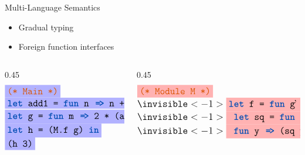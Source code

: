 \begin{frame}

  \huge Multi-Language Semantics \pause

  \vspace{1em}
  \begin{itemize}
  \Large
  \item Gradual typing \pause
  \item Foreign function interfaces
  \end{itemize}

\end{frame}

\begin{frame}

  \Large
  \begin{columns}[t]
    \begin{column}{0.45\textwidth}
      \[
      \large
      \begin{array}{@{}ll@{}}
        \bluebox{\mex{\textcolor{dkcomment}{(* Main *)}}}\\
        \bluebox{\mex{\kw{let} add1 = \kw{fun} n \codearr n + 1 \kw{in}}} \\
        \bluebox{\mex{\kw{let} g = \kw{fun} m \codearr 2 * (add1 m) \kw{in}}} \\
        \bluebox{\mex{\kw{let} h = (M.f g) \kw{in}}} \\
        \bluebox{\mex{(h 3)}}
      \end{array}
      \]
    \end{column}

    \begin{column}{0.45\textwidth}
      \[
      \large
      \begin{array}{@{}ll@{}}
        \redbox{\mex{\textcolor{dkcomment}{(* Module M *)}}} \\
        \invisible<-1>{\redbox{\mex{\kw{let} f = \kw{fun} g\codequote\ \codearr}}}\\
        \invisible<-1>{\redbox{\mex{                      \kw{let} sq = \kw{fun} x \codearr x * x\ \kw{in}}}}\\
        \invisible<-1>{\redbox{\mex{                      \kw{fun} y \codearr (sq y) * (g\codequote\ y)}}}
      \end{array}
      \]
    \end{column}
  \end{columns}


\end{frame}

